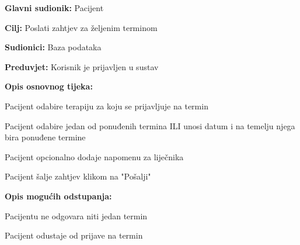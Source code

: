 				\noindent {}
				\begin{packed_item}
					
					\item \textbf{Glavni sudionik: }Pacijent
					\item  \textbf{Cilj: }Poslati zahtjev za željenim terminom
					\item  \textbf{Sudionici: }Baza podataka
					\item  \textbf{Preduvjet: }Korisnik je prijavljen u sustav
					\item  \textbf{Opis osnovnog tijeka: }
					
					\item[] \begin{packed_enum}
						
						\item Pacijent odabire terapiju za koju se prijavljuje na termin
						\item Pacijent odabire jedan od ponuđenih termina ILI unosi datum i na temelju njega bira ponuđene termine
						\item Pacijent opcionalno dodaje napomenu za liječnika
						\item Pacijent šalje zahtjev klikom na "Pošalji" 
					\end{packed_enum}
					
					\item  \textbf{Opis mogućih odstupanja:}
					
					\item[] \begin{packed_item}
						
						\item[2.a] Pacijentu ne odgovara niti jedan termin
						\item[] \begin{packed_enum}
							
							\item Pacijent odustaje od prijave na termin
							
						\end{packed_enum}
						
					\end{packed_item}
				\end{packed_item}
				
			
				
